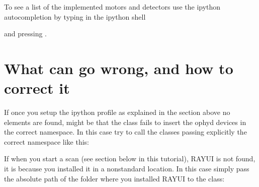 \documentclass[letterpaper,10pt,english]{sphinxmanual}
\begin{document}
\sphinxAtStartPar
To see a list of the implemented motors and detectors use the ipython autocompletion by typing in the ipython shell

\begin{sphinxVerbatim}[commandchars=\\\{\}]
\end{sphinxVerbatim}

\sphinxAtStartPar
and pressing .


\section{What can go wrong, and how to correct it}
\label{\detokenize{tutorial:what-can-go-wrong-and-how-to-correct-it}}
\sphinxAtStartPar
If once you setup the ipython profile as explained in the section above no elements are found, might be that the 
class fails to insert the ophyd devices in the correct namespace. In this case try to call the classes passing explicitly the correct namespace
like this:

\begin{sphinxVerbatim}[commandchars=\\\{\}]
 
     
\end{sphinxVerbatim}

\sphinxAtStartPar
If when you start a scan (see section below in this tutorial), RAY\sphinxhyphen{}UI is not found, it is because you installed it in a non\sphinxhyphen{}standard location.
In this case simply pass the absolute path of the folder where you installed RAY\sphinxhyphen{}UI to the class:

\begin{sphinxVerbatim}[commandchars=\\\{\}]
   
     
\end{sphinxVerbatim}
\end{document}

